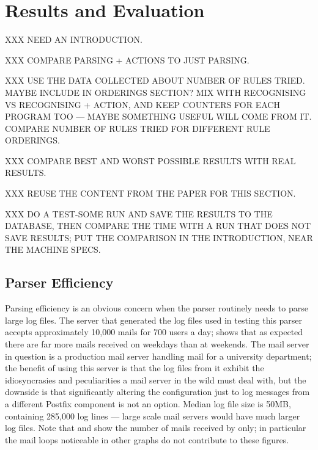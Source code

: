\chapter{Results and Evaluation}

\label{Results}

XXX NEED AN INTRODUCTION\@.

XXX COMPARE PARSING + ACTIONS TO JUST PARSING\@.

XXX USE THE DATA COLLECTED ABOUT NUMBER OF RULES TRIED\@.  MAYBE INCLUDE IN
ORDERINGS SECTION\@?  MIX WITH RECOGNISING VS RECOGNISING + ACTION, AND
KEEP COUNTERS FOR EACH PROGRAM TOO --- MAYBE SOMETHING USEFUL WILL COME
FROM IT\@.  COMPARE NUMBER OF RULES TRIED FOR DIFFERENT RULE ORDERINGS\@.

XXX COMPARE BEST AND WORST POSSIBLE RESULTS WITH REAL RESULTS\@.

XXX REUSE THE CONTENT FROM THE PAPER FOR THIS SECTION\@.

XXX DO A TEST-SOME RUN AND SAVE THE RESULTS TO THE DATABASE, THEN COMPARE
THE TIME WITH A RUN THAT DOES NOT SAVE RESULTS\@; PUT THE COMPARISON IN THE
INTRODUCTION, NEAR THE MACHINE SPECS\@.

\section{Parser Efficiency}

\label{parser efficiency}

Parsing efficiency is an obvious concern when the parser routinely needs to
parse large log files.  The server that generated the log files used in
testing this parser accepts approximately 10,000 mails for 700 users a day;
 shows that as expected there are far more
mails received on weekdays than at weekends.  The mail server in question
is a production mail server handling mail for a university department; the
benefit of using this server is that the log files from it exhibit the
idiosyncrasies and peculiarities a mail server in the wild must deal with,
but the downside is that significantly altering the configuration just to
log messages from a different Postfix component is not an option.  Median
log file size is 50MB, containing 285,000 log lines --- large scale mail
servers would have much larger log files.  Note that  and  show the number of mails received by  only; in
particular the mail loops noticeable in other graphs do not contribute to
these figures.

